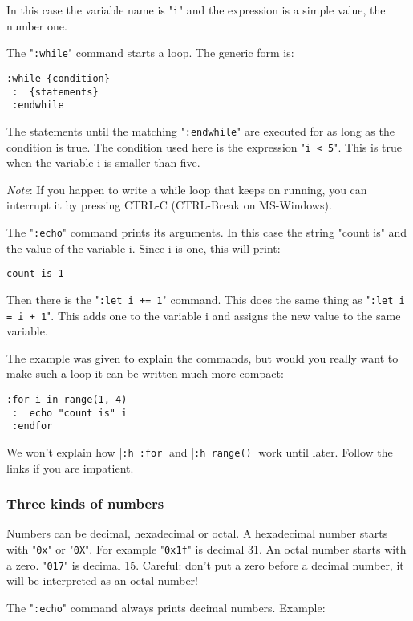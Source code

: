 In this case the variable name is "\verb!i!" and the expression is a simple value, the number one.

The "\verb!:while!" command starts a loop.
The generic form is:

\begin{Verbatim}[samepage=true]
 :while {condition}
 :  {statements}
 :endwhile
\end{Verbatim}

The statements until the matching "\verb!:endwhile!" are executed for as long as the condition is true.
The condition used here is the expression "\verb!i < 5!".
This is true when the variable i is smaller than five.

\emph{Note}: If you happen to write a while loop that keeps on running, you can interrupt it by pressing CTRL-C (CTRL-Break on MS-Windows).

The "\verb!:echo!" command prints its arguments.
In this case the string "count is" and the value of the variable i.
Since i is one, this will print:

\begin{Verbatim}[samepage=true]
    count is 1
\end{Verbatim}

Then there is the "\verb!:let i += 1!" command.
This does the same thing as "\verb!:let i = i + 1!".
This adds one to the variable i and assigns the new value to the same variable.

The example was given to explain the commands, but would you really want to make such a loop it can be written much more compact:

\begin{Verbatim}[samepage=true]
 :for i in range(1, 4)
 :  echo "count is" i
 :endfor
\end{Verbatim}

We won't explain how |\verb!:h :for!| and |\verb!:h range()!| work until later.
Follow the links if you are impatient.

\subsubsection{Three kinds of numbers}
Numbers can be decimal, hexadecimal or octal.
A hexadecimal number starts with "\verb!0x!" or "\verb!0X!".
For example "\verb!0x1f!" is decimal 31.
An octal number starts with a zero.
"\verb!017!" is decimal 15.
Careful: don't put a zero before a decimal number, it will be interpreted as an octal number!

The "\verb!:echo!" command always prints decimal numbers.
Example:

